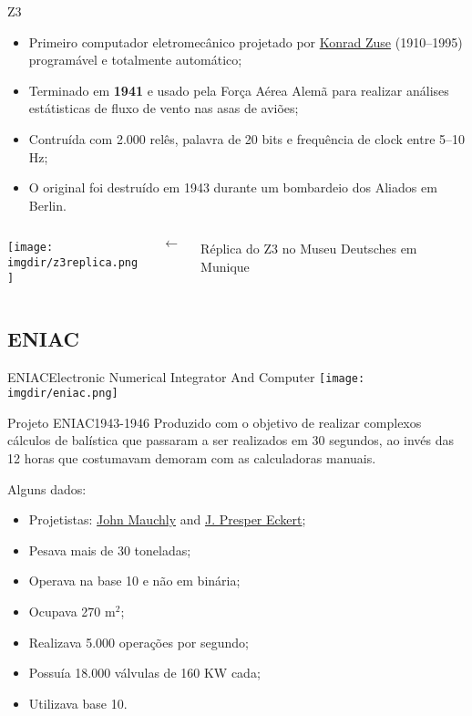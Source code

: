\begin{frame}{Z3}
\small
\begin{itemize}
\item Primeiro computador eletromecânico projetado por
  \href{http://en.wikipedia.org/wiki/Konrad_Zuse}{Konrad Zuse}
(1910--1995) programável e totalmente automático;
\item Terminado em {\bf 1941} e usado pela Força Aérea Alemã para
  realizar análises estátisticas de fluxo de vento nas asas de aviões;
\item Contruída com 2.000 relês, palavra de 20 bits e frequência de
  clock entre 5--10 Hz;
\item O original foi destruído em 1943 durante um bombardeio dos
  Aliados em Berlin.
\end{itemize}

\begin{center}
  \begin{columns}
    \begin{column}{.6\textwidth}
      \texttt{[image: \\imgdir/z3replica.png]}
    \end{column}
    $\longleftarrow$
    \begin{column}{.4\textwidth}
       Réplica do Z3 no Museu Deutsches em Munique
    \end{column}
  \end{columns}
\end{center}

\end{frame}

\subsection{ENIAC}
\begin{frame}{ENIAC}{Electronic Numerical Integrator And Computer}
\texttt{[image: \\imgdir/eniac.png]}
\end{frame}

\begin{frame}{Projeto ENIAC}{1943-1946}
\small
Produzido com o objetivo de realizar complexos cálculos de balística
que passaram a ser realizados em 30 segundos, ao invés das 12 horas
que costumavam demoram com as calculadoras manuais.

\begin{block}{Alguns dados:}
\begin{itemize}
\item Projetistas: \href{http://en.wikipedia.org/wiki/John_Mauchly}{John Mauchly} and \href{http://en.wikipedia.org/wiki/J._Presper_Eckert}{J. Presper Eckert};
\item Pesava mais de 30 toneladas;
\item Operava na base 10 e não em binária;
\item Ocupava 270 m$^2$;
\item Realizava 5.000 operações por segundo;
\item Possuía 18.000 válvulas de 160 KW cada;
\item Utilizava base 10.
\end{itemize}
\end{block}
\end{frame}

